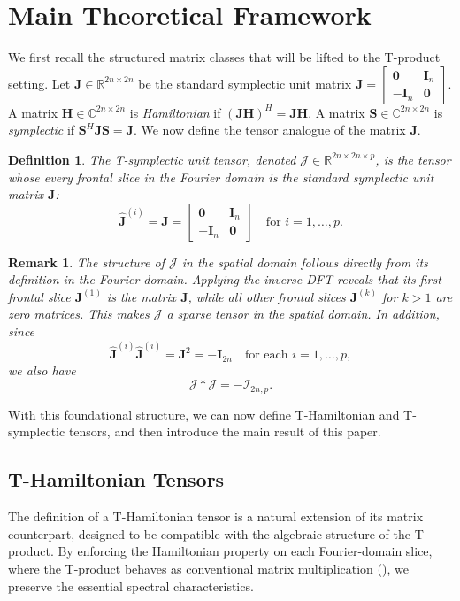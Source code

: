 \documentclass[pdflatex,sn-mathphys-ay]{sn-jnl}
\newcommand{\T}[1]{\mathcal{#1}}    %
\newcommand{\M}[1]{\bm{#1}}     %
\newcommand{\C}{\mathbb{C}}         %
\newcommand{\R}{\mathbb{R}}         %
\theoremstyle{thmstyleone}
\theoremstyle{thmstyletwo}
\theoremstyle{thmstylethree}
\newtheorem{definition}[theorem]{Definition}
\newtheorem{remark}[theorem]{Remark}
\numberwithin{equation}{section}
\begin{document}
\section{Main Theoretical Framework}
\label{sec:framework}

We first recall the structured matrix classes that will be lifted to the T-product setting.
Let $\M{J} \in \R^{2n \times 2n}$ be the standard symplectic unit matrix
$\M{J} = \begin{bmatrix} \M{0} & \M{I}_{n} \\ -\M{I}_{n} & \M{0} \end{bmatrix}$.
A matrix $\M{H} \in \C^{2n \times 2n}$ is \emph{Hamiltonian} if $(\M{J}\M{H})^H = \M{J}\M{H}$. 
A matrix $\M{S} \in \C^{2n \times 2n}$ is \emph{symplectic} if $\M{S}^H \M{J} \M{S} = \M{J}$. 
We now define the tensor analogue of the matrix $\M{J}$.

\begin{definition}
\label{def:t_unit_J}
The \emph{T-symplectic unit tensor}, denoted $\T{J} \in \R^{2n \times 2n \times p}$, is the tensor whose every frontal slice in the Fourier domain is the standard symplectic unit matrix $\M{J}$:
$$
    \hat{\M{J}}^{(i)} = \M{J} = \begin{bmatrix} \M{0} & \M{I}_{n} \\ -\M{I}_{n} & \M{0} \end{bmatrix} \quad \text{for } i = 1, \dots, p.
$$
\end{definition}

\begin{remark}\label{rmk:J}
The structure of $\T{J}$ in the spatial domain follows directly from its definition in the Fourier domain. 
Applying the inverse DFT reveals that its first frontal slice $\M{J}^{(1)}$ is the matrix $\M{J}$, while all other frontal slices $\M{J}^{(k)}$ for $k > 1$ are zero matrices. 
This makes $\T{J}$ a sparse tensor in the spatial domain. In addition, since
$$
\widehat{\M{J}}^{(i)}\widehat{\M{J}}^{(i)} = \M{J}^2 = -\M{I}_{2n}
\quad \text{for each } i=1,\dots,p,
$$
we also have
$$
\T{J} * \T{J} = -\T{I}_{2n,p}.
$$
\end{remark}

With this foundational structure, we can now define T-Hamiltonian and T-symplectic tensors, and then introduce the main result of this paper.

\subsection{T-Hamiltonian Tensors}
The definition of a T-Hamiltonian tensor is a natural extension of its matrix counterpart, designed to be compatible with the algebraic structure of the T-product.
By enforcing the Hamiltonian property on each Fourier-domain slice, where the T-product behaves as conventional matrix multiplication (\cite{kilmer2011factorization}), we preserve the essential spectral characteristics.
\end{document}

